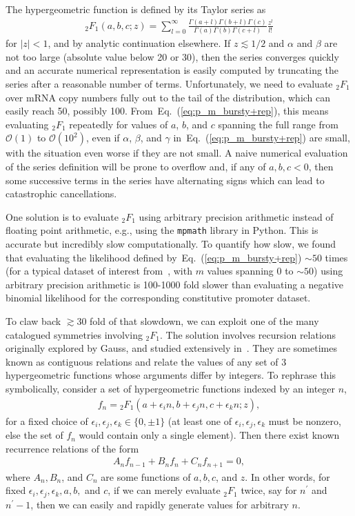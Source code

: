 \documentclass[12pt]{article}%
\newcommand{\eq}[1]{Eq.~(\ref{#1})}
\begin{document}
The hypergeometric function is defined by its Taylor series as
\begin{align}
{_2F_1}(a,b,c;z) 
= \sum_{l=0}^\infty
\frac{\Gamma(a + l)\Gamma(b + l)\Gamma(c)}
        {\Gamma(a)\Gamma(b)\Gamma(c + l)}
\frac{z^l}{l!}
\end{align}
for $|z|<1$, and by analytic continuation elsewhere.
If $z\lesssim1/2$ and $\alpha$ and $\beta$ are not too large
(absolute value below 20 or 30),
then the series converges quickly and an accurate numerical representation is
easily computed by truncating the series after a reasonable number of terms.
Unfortunately, we need to evaluate ${_2F_1}$ over mRNA copy numbers fully out
to the tail of the distribution, which can easily reach 50, possibly 100.
From~\eq{eq:p_m_bursty+rep}, this means evaluating ${_2F_1}$
repeatedly for values of $a$, $b$, and $c$ spanning the full range
from $\mathcal{O}(1)$ to $\mathcal{O}(10^2)$,
even if $\alpha$, $\beta$, and $\gamma$
in~\eq{eq:p_m_bursty+rep} are small,
with the situation even worse if they are not small.
A naive numerical evaluation of the series definition will be
prone to overflow and, if any of $a,b,c<0$, then some successive terms in the
series have alternating signs which can lead to catastrophic cancellations.

One solution is to evaluate ${_2F_1}$ using arbitrary precision arithmetic
instead of floating point arithmetic,
e.g., using the \texttt{mpmath} library in Python.
This is accurate but incredibly slow computationally.
To quantify how slow, we found that
evaluating the likelihood defined by~\eq{eq:p_m_bursty+rep} $\sim50$ times
(for a typical dataset of interest from~\cite{Jones2014},
with $m$ values spanning 0 to $\sim50$)
using arbitrary precision arithmetic is 100-1000 fold slower than
evaluating a negative binomial likelihood for the corresponding
constitutive promoter dataset.

To claw back $\gtrsim30$ fold of that slowdown, we can exploit
one of the many catalogued symmetries involving ${_2F_1}$.
The solution involves recursion relations originally explored by Gauss,
and studied extensively in~\cite{Pearson2017, Gil2007}.
They are sometimes known as contiguous relations and relate the values
of any set of 3 hypergeometric functions whose arguments differ by integers.
To rephrase this symbolically, consider a set of hypergeometric functions
indexed by an integer $n$,
\begin{align}
f_n = {_2F_1}(a+\epsilon_i n, b+\epsilon_j n, c+\epsilon_k n; z),
\end{align}
for a fixed choice of $\epsilon_i, \epsilon_j, \epsilon_k \in \{0,\pm 1\}$
(at least one of $\epsilon_i, \epsilon_j, \epsilon_k$ must be nonzero,
else the set of $f_n$ would contain only a single element).
Then there exist known recurrence relations of the form
\begin{align}
A_n f_{n-1} + B_n f_{n} + C_n f_{n+1} = 0,
\end{align}
where $A_n, B_n$, and $C_n$ are some functions of $a,b,c$, and $z$.
In other words, for fixed $\epsilon_i, \epsilon_j, \epsilon_k, a, b,$ and $c$,
if we can merely evaluate ${_2F_1}$ twice, say for $n^\prime$ and $n^\prime-1$,
then we can easily and rapidly generate values for arbitrary $n$.
\end{document}
